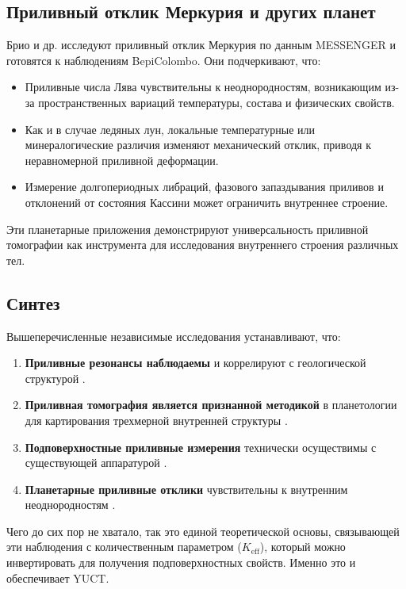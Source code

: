 \documentclass[12pt,a4paper]{article}
\theoremstyle{remark}
\newcommand{\Keff}{K_{\mathrm{eff}}}
\begin{document}
	\subsection{Приливный отклик Меркурия и других планет}
	
	Брио и др. \cite{Briaud2025} исследуют приливный отклик Меркурия по данным MESSENGER и готовятся к наблюдениям BepiColombo. Они подчеркивают, что:
	
	\begin{itemize}
		\item Приливные числа Лява чувствительны к неоднородностям, возникающим из-за пространственных вариаций температуры, состава и физических свойств.
		\item Как и в случае ледяных лун, локальные температурные или минералогические различия изменяют механический отклик, приводя к неравномерной приливной деформации.
		\item Измерение долгопериодных либраций, фазового запаздывания приливов и отклонений от состояния Кассини может ограничить внутреннее строение.
	\end{itemize}
	
	Эти планетарные приложения демонстрируют универсальность приливной томографии как инструмента для исследования внутреннего строения различных тел.
	
	\subsection{Синтез}
	
	Вышеперечисленные независимые исследования устанавливают, что:
	
	\begin{enumerate}
		\item \textbf{Приливные резонансы наблюдаемы} и коррелируют с геологической структурой \cite{Sibgatulin2014}.
		\item \textbf{Приливная томография является признанной методикой} в планетологии для картирования трехмерной внутренней структуры \cite{RoviraNavarro2025}.
		\item \textbf{Подповерхностные приливные измерения} технически осуществимы с существующей аппаратурой \cite{Rogister2024}.
		\item \textbf{Планетарные приливные отклики} чувствительны к внутренним неоднородностям \cite{Briaud2025}.
	\end{enumerate}
	
	Чего до сих пор не хватало, так это единой теоретической основы, связывающей эти наблюдения с количественным параметром ($\Keff$), который можно инвертировать для получения подповерхностных свойств. Именно это и обеспечивает YUCT.
	
\end{document}
